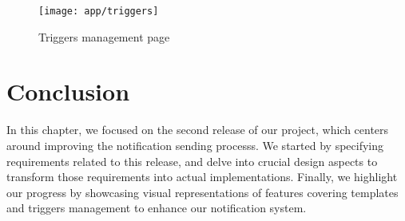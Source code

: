 \begin{figure}[hbt!]
    \centering
    \texttt{[image: app/triggers]}
    \caption{Triggers management page}
    \label{ss-triggers}
\end{figure}


\section*{Conclusion}


In this chapter, we focused on the second release of our project, which centers around improving
the notification sending processs. We started by specifying requirements related to this release,
and delve into crucial design aspects to transform those requirements into actual implementations.
Finally, we highlight our progress by showcasing visual representations of features covering
templates and triggers management to enhance our notification system.